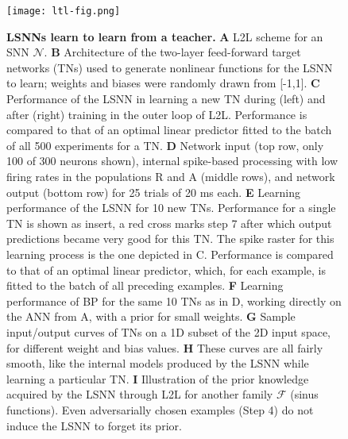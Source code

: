 \documentclass{article} \pdfoutput=1
\begin{document}
\begin{figure}[p]
	\texttt{[image: ltl-fig.png]}
\caption{
		\label{fig:ltl} \textbf{LSNNs learn to learn from a teacher.} 
        \textbf{A} L2L scheme for an SNN $\mathcal{N}$.
		\textbf{B} Architecture of the two-layer feed-forward target networks (TNs) used to generate nonlinear functions for the LSNN to learn; weights and biases were randomly drawn from [-1,1].
        \textbf{C} Performance of the LSNN in learning a new TN during (left) and after (right) training in the outer loop of L2L. Performance is compared to that of an optimal linear predictor fitted to the batch of all 500 experiments for a TN.
\textbf{D} Network input (top row, only 100 of 300 neurons shown),
		internal spike-based processing with low firing rates in the populations R and A (middle rows), and network output (bottom row) for 25 trials of 20 ms each. 
\textbf{E} Learning performance of the LSNN for 10 new TNs. Performance for a single TN is shown as insert, a red cross marks step 7 after which output predictions became very good for this TN. The spike raster for this learning process is the one depicted in C. Performance is compared to that of an optimal linear predictor, which, for each example, is fitted to the batch of all preceding examples.
\textbf{F} Learning performance of BP for the same 10 TNs as in D, working directly on the ANN from A, with a prior for small weights. 
\textbf{G} Sample input/output curves of TNs on a 1D subset of the 2D input space, for different weight and bias values.
		\textbf{H} These curves are all fairly smooth, like the internal models produced by the LSNN while learning a particular TN.
		\textbf{I} Illustration of the prior knowledge acquired by the LSNN through L2L for another family $\mathcal{F}$ (sinus functions). Even adversarially chosen examples (Step 4) do not induce the LSNN to forget its prior.
} 
\end{figure}
\end{document}
